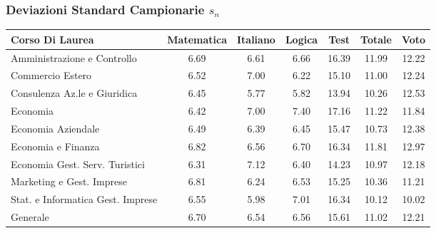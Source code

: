 \subsubsection{Deviazioni Standard Campionarie $s_n$}
\begin{center}
\begin{tabular}{lcccccc}
  \toprule
  Corso Di Laurea & Matematica & Italiano & Logica & Test & Totale & Voto \\ 
  \midrule
  Amministrazione e Controllo & 6.69 & 6.61 & 6.66 & 16.39 & 11.99 & 12.22 \\ 
  Commercio Estero & 6.52 & 7.00 & 6.22 & 15.10 & 11.00 & 12.24 \\ 
  Consulenza Az.le e Giuridica & 6.45 & 5.77 & 5.82 & 13.94 & 10.26 & 12.53 \\ 
  Economia & 6.42 & 7.00 & 7.40 & 17.16 & 11.22 & 11.84 \\ 
  Economia Aziendale & 6.49 & 6.39 & 6.45 & 15.47 & 10.73 & 12.38 \\ 
  Economia e Finanza & 6.82 & 6.56 & 6.70 & 16.34 & 11.81 & 12.97 \\ 
  Economia Gest. Serv. Turistici & 6.31 & 7.12 & 6.40 & 14.23 & 10.97 & 12.18 \\ 
  Marketing e Gest. Imprese & 6.81 & 6.24 & 6.53 & 15.25 & 10.36 & 11.21 \\ 
  Stat. e Informatica Gest. Imprese & 6.55 & 5.98 & 7.01 & 16.34 & 10.12 & 10.02 \\ 
  \addlinespace
  Generale & 6.70 & 6.54 & 6.56 & 15.61 & 11.02 & 12.21 \\ 
  \bottomrule
\end{tabular}
\end{center}

\restoregeometry
